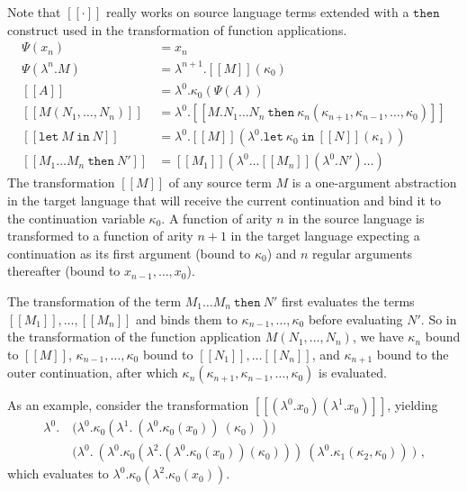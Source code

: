 \documentclass[a4paper,11pt,draft]{article}
\newcommand{\kw}[1]{\mathtt{#1}}
\begin{document}
Note that $[\![\cdot]\!]$ really works on source language terms extended with
a $\kw{then}$ construct used in the transformation of function applications.
\begin{align*}
\Psi(x_{n}) &=
  x_{n} \\
\Psi(\lambda^{n}.M) &=
  \lambda^{n+1}.[\![M]\!](\kappa_{0}) \\[1em]
[\![A]\!] &=
  \lambda^{0}.\kappa_{0} (\Psi(A)) \\
[\![M(N_{1}, \ldots, N_{n})]\!] &=
  \lambda^{0}.[\![M . N_{1} \ldots N_{n} \: \kw{then} \:
  \kappa_{n}(\kappa_{n+1}, \kappa_{n-1}, \ldots, \kappa_{0})]\!] \\
[\![\kw{let} \: M \: \kw{in} \: N]\!] &=
  \lambda^{0}.[\![M]\!] (\lambda^{0}.\kw{let} \:
  \kappa_{0} \: \kw{in} \: [\![N]\!] (\kappa_{1})) \\
[\![M_{1} \ldots M_{n} \: \kw{then} \: N']\!] &=
  [\![M_{1}]\!] (\lambda^{0} \ldots [\![M_{n}]\!] (\lambda^{0}.N') \ldots )
\end{align*}
The transformation $[\![M]\!]$ of any source term $M$ is a one-argument
abstraction in the target language that will receive the current continuation
and bind it to the continuation variable $\kappa_{0}$. A function of arity $n$
in the source language is transformed to a function of arity $n+1$ in the
target language expecting a continuation as its first argument (bound
to $\kappa_{0}$) and $n$ regular arguments thereafter
(bound to $x_{n-1}, \ldots, x_{0}$).

The transformation of the term $M_{1} \ldots M_{n} \: \kw{then} \: N'$ first
evaluates the terms
$[\![M_{1}]\!], \ldots, [\![M_{n}]\!]$ and binds them to
$\kappa_{n-1}, \ldots, \kappa_{0}$ before evaluating $N'$. So in the
transformation of the function application
$M(N_{1}, \ldots, N_{n})$, we have $\kappa_{n}$ bound to $[\![M]\!]$,
$\kappa_{n-1}, \ldots, \kappa_{0}$ bound to $[\![N_{1}]\!], \ldots [\![N_{n}]\!]$,
and $\kappa_{n+1}$ bound to the outer continuation, after which
$\kappa_{n}(\kappa_{n+1}, \kappa_{n-1}, \ldots, \kappa_{0})$ is evaluated.

As an example, consider the transformation
$[\![(\lambda^{0}.x_{0})(\lambda^{1}.x_{0})]\!]$, yielding
\begin{align*}
  \lambda^{0}. \:& \bigl( \lambda^{0}.\kappa_{0}(\lambda^{1}. \: (\lambda^{0}.\kappa_{0}(x_{0})) \: (\kappa_{0}) \: ) \bigr)\\
  & \bigl( \lambda^{0}. \: (\lambda^{0}.\kappa_{0}(\lambda^{2}.(\lambda^{0}.\kappa_{0}(x_{0}))(\kappa_{0}))) \: (\lambda^{0}.\kappa_{1}(\kappa_{2},\kappa_{
    0})) \: \bigr) \text{ ,}
\end{align*}
which evaluates to $\lambda^{0}. \kappa_{0}(\lambda^{2}.\kappa_{0}(x_{0}))$.
\end{document}
